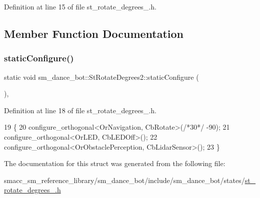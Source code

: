 Definition at line 15 of file st\+\_\+rotate\+\_\+degrees\+\_.\+h.



\subsection{Member Function Documentation}
\mbox{\label{structsm__dance__bot_1_1StRotateDegrees2_ac6566aa987d37915d13b974a8fe8df42}} 
\subsubsection{\texorpdfstring{static\+Configure()}{staticConfigure()}}
{\footnotesize\ttfamily static void sm\+\_\+dance\+\_\+bot\+::\+St\+Rotate\+Degrees2\+::static\+Configure (\begin{DoxyParamCaption}{ }\end{DoxyParamCaption})\hspace{0.3cm}{\ttfamily [inline]}, {\ttfamily [static]}}



Definition at line 18 of file st\+\_\+rotate\+\_\+degrees\+\_.\+h.


\begin{DoxyCode}
19   \{
20     configure\_orthogonal<OrNavigation, CbRotate>(\textcolor{comment}{/*30*/} -90);
21     configure\_orthogonal<OrLED, CbLEDOff>();
22     configure\_orthogonal<OrObstaclePerception, CbLidarSensor>();
23   \}
\end{DoxyCode}


The documentation for this struct was generated from the following file\+:\begin{DoxyCompactItemize}
\item 
smacc\+\_\+sm\+\_\+reference\+\_\+library/sm\+\_\+dance\+\_\+bot/include/sm\+\_\+dance\+\_\+bot/states/\hyperlink{sm__dance__bot_2include_2sm__dance__bot_2states_2st__rotate__degrees__2_8h}{st\+\_\+rotate\+\_\+degrees\+\_.\+h}\end{DoxyCompactItemize}
